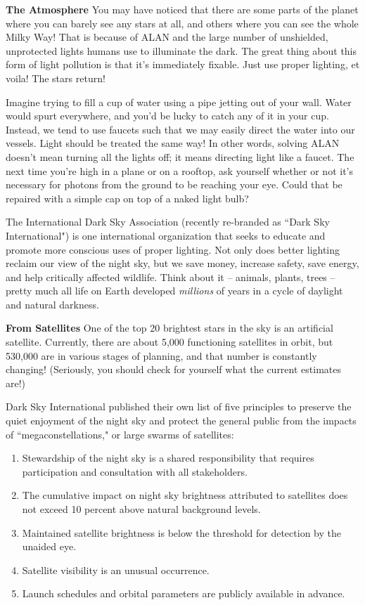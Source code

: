 \textbf{The Atmosphere} You may have noticed that there are some parts of the planet where you can barely see any stars at all, and others where you can see the whole Milky Way! That is because of ALAN and the large number of unshielded, unprotected lights humans use to illuminate the dark. The great thing about this form of light pollution is that it's immediately fixable. Just use proper lighting, et voila! The stars return!

Imagine trying to fill a cup of water using a pipe jetting out of your wall. Water would spurt everywhere, and you'd be lucky to catch any of it in your cup. Instead, we tend to use faucets such that we may easily direct the water into our vessels. Light should be treated the same way! In other words, solving ALAN doesn't mean turning all the lights off; it means directing light like a faucet. The next time you're high in a plane or on a rooftop, ask yourself whether or not it's necessary for photons from the ground to be reaching your eye. Could that be repaired with a simple cap on top of a naked light bulb?

The International Dark Sky Association (recently re-branded as ``Dark Sky International") is one international organization that seeks to educate and promote more conscious uses of proper lighting. Not only does better lighting reclaim our view of the night sky, but we save money, increase safety, save energy, and help critically affected wildlife. Think about it -- animals, plants, trees -- pretty much all life on Earth developed \textit{millions} of years in a cycle of daylight and natural darkness.

\textbf{From Satellites} One of the top 20 brightest stars in the sky is an artificial satellite. Currently, there are about 5,000 functioning satellites in orbit, but 530,000 are in various stages of planning, and that number is constantly changing! (Seriously, you should check for yourself what the current estimates are!)

Dark Sky International published their own list of five principles to preserve the quiet enjoyment of the night sky and protect the general public from the impacts of ``megaconstellations," or large swarms of satellites:
\begin{enumerate}
    \item Stewardship of the night sky is a shared responsibility that requires participation and consultation with all stakeholders.
    \item The cumulative impact on night sky brightness attributed to satellites does not exceed 10 percent above natural background levels.
    \item Maintained satellite brightness is below the threshold for detection by the unaided eye.
    \item Satellite visibility is an unusual occurrence.
    \item Launch schedules and orbital parameters are publicly available in advance.
\end{enumerate}

